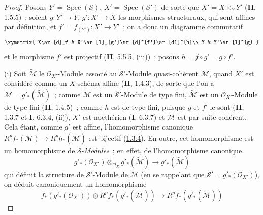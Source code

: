 \begin{proof}
Posons $Y'=\operatorname{Spec}(\mathcal S)$,
$X'=\operatorname{Spec}(\mathcal S')$ de sorte que
$X'=X\times_Y Y'$ (\textbf{II}, 1.5.5)~; soient $g:Y'\to Y$,
$g':X'\to X$ les morphismes structuraux, qui sont affines par
définition, et $f'=f_{(Y')}:X'\to Y'$~; on a donc un diagramme
commutatif
\[
\xymatrix{
X\ar[d]_f & X'\ar[l]_{g'}\ar[d]^{f'}\ar[dl]^{h}\\
Y & Y'\ar[l]^{g}
}
\]
et le morphisme $f'$ est projectif (\textbf{II}, 5.5.5, (iii))~; posons
$h=f\circ g'=g\circ f'$.

(i) Soit $\widetilde{\mathcal M}$ le $\mathcal O_{X'}$-Module associé au
$\mathcal S'$-Module quasi-cohérent $\mathcal M$, quand $X'$ est
considéré comme un $X$-schéma affine (\textbf{II}, 1.4.3), de sorte que l'on a
$\mathcal M=g'_*(\widetilde{\mathcal M})$~; comme $\mathcal M$ est un
$\mathcal S'$-Module de type fini, $\widetilde{\mathcal M}$ est un
$\mathcal O_{X'}$-Module de type fini (\textbf{II}, 1.4.5)~; comme $h$ est de type
fini, puisque $g$ et $f'$ le sont (\textbf{II}, 1.3.7 et \textbf{I}, 6.3.4, (ii)), $X'$ est
noethérien (\textbf{I}, 6.3.7) et $\widetilde{\mathcal M}$ est par suite cohérent.
Cela étant, comme $g'$ est affine, l'homomorphisme canonique
$R^pf_*(\mathcal M)\to R^ph_*(\widetilde{\mathcal M})$ est bijectif
(\hyperref[III.1.3.4-fr]{1.3.4}). En outre, cet homomorphisme est un
homomorphisme de $\mathcal S$-\emph{Modules}~; en effet, de l'homomorphisme
canonique
\[
g'_*(\mathcal O_{X'})\otimes_{\mathcal O_X}
g'_*(\widetilde{\mathcal M})\longrightarrow
g'_*(\widetilde{\mathcal M})
\tag{2.4.1.2}\label{III.2.4.1.2-fr}
\]
qui définit la structure de $\mathcal S'$-Module de $\mathcal M$ (en se
rappelant que $\mathcal S'=g'_*(\mathcal O_{X'})$), on déduit
canoniquement un homomorphisme
\[
f_*(g'_*(\mathcal O_{X'}))\otimes
R^pf_*(g'_*(\widetilde{\mathcal M}))\longrightarrow
R^pf_*(g'_*(\widetilde{\mathcal M}))
\]


\end{proof}
